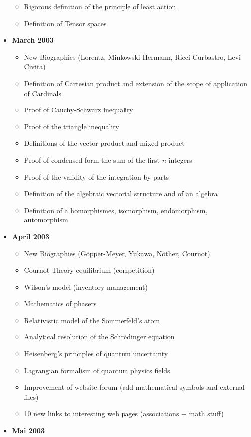 \documentclass[12pt,a4paper,twoside,openright]{report}
\newcounter{def}
\theoremstyle{definition}
\theoremstyle{itexmp}
\numberwithin{equation}{section}
\begin{document}
\begin{itemize}
\begin{itemize}[noitemsep]
				\item Rigorous definition of the principle of least action
				\item Definition of Tensor spaces
				\end{itemize}
		\item \textbf{March 2003}
			\begin{itemize}[noitemsep]
				\item New Biographies (Lorentz, Minkowski Hermann, Ricci-Curbastro, Levi-Civita)
				\item Definition of Cartesian product and extension of the scope of application of Cardinals
				\item Proof of Cauchy-Schwarz inequality
				\item Proof of the triangle inequality 
				\item Definitions of the vector product and mixed product 
				\item Proof of condensed form the sum of the first $n$ integers 
				\item Proof of the validity of the integration by parts 
				\item Definition of the algebraic vectorial structure and of an algebra 
				\item Definition of a homorphismes, isomorphism, endomorphism, automorphism
			\end{itemize}
		\item \textbf{April 2003}
			\begin{itemize}[noitemsep]
				\item New Biographies (Göpper-Meyer, Yukawa, Nöther, Cournot)
				\item Cournot Theory equilibrium (competition)
				\item Wilson's model (inventory management)
				\item Mathematics of phasers
				\item Relativistic model of the Sommerfeld's atom
				\item Analytical resolution of the Schrödinger equation
				\item Heisenberg's principles of quantum  uncertainty
				\item Lagrangian formalism of quantum physics fields
				\item Improvement of website forum (add mathematical symbols and external files)
				\item 10 new links to interesting web pages (associations + math stuff)
			\end{itemize}
		\item \textbf{Mai 2003}

\end{itemize}
\end{document}
